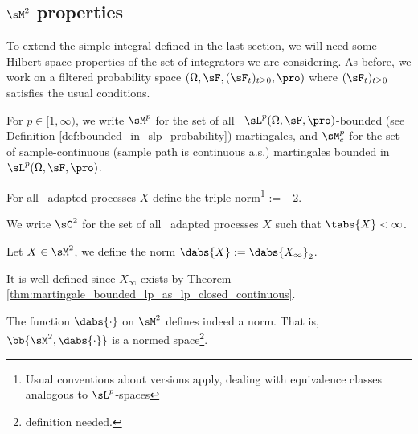 \subsection{$\sM^2$ properties}

To extend the simple integral defined in the last section, we will need some Hilbert space properties of the set of integrators we are considering. As before, we work on a filtered probability space $(\Omega,\sF,
(\sF_t)_{t\geq0},\pro)$ where $(\sF_t)_{t\geq0}$ satisfies the usual conditions.

\begin{definition}[$\sM^p$ and $\sM^p_c$]\label{def:martingale_space_bounded_in_lp}
For $p\in [1,\infty)$, we write $\sM^p$ for the set of all \cadlag\ $\sL^p(\Omega,\sF,\pro)$-bounded (see Definition \ref{def:bounded_in_slp_probability}) martingales, and $\sM^p_c$ for the set of sample-continuous (sample path is continuous a.s.) martingales bounded in $\sL^p(\Omega,\sF,\pro)$. %
\end{definition}


\begin{definition}\label{def:triple_norm_process}
For all \cadlag\ adapted processes $X$ define the triple norm\footnote{Usual conventions about versions apply, dealing with equivalence classes analogous to $\sL^p$-spaces} \be {} := _2.
\ee
\end{definition}

\begin{definition}[$\sC^2$]
We write $\sC^2$ for the set of all \cadlag\ adapted processes $X$ such that $\tabs{X} < \infty$.
\end{definition}


\begin{definition}\label{def:double_norm_process}
Let $X\in \sM^2$, we define the norm $\dabs{X} := \dabs{X_\infty}_2$.
\end{definition}

\begin{remark}
It is well-defined since $X_\infty$ exists by Theorem \ref{thm:martingale_bounded_lp_as_lp_closed_continuous}.
\end{remark}

\begin{theorem}
The function $\dabs{\cdot}$ on $\sM^2$ defines indeed a norm. That is, $\bb{\sM^2,\dabs{\cdot}}$ is a normed space\footnote{definition needed.}.
\end{theorem}

